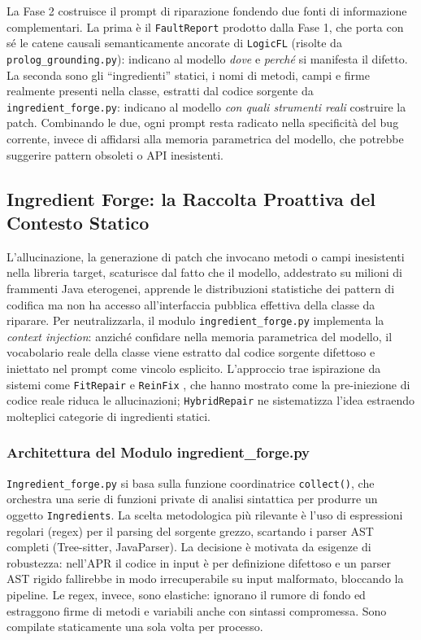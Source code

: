 La Fase 2 costruisce il prompt di riparazione fondendo due fonti di informazione complementari. La prima è il
\texttt{FaultReport} prodotto dalla Fase 1, che porta con sé le catene causali semanticamente ancorate di
\texttt{LogicFL} (risolte da \texttt{prolog\_grounding.py}): indicano al modello \emph{dove} e \emph{perché} si
manifesta il difetto. La seconda sono gli ``ingredienti'' statici, i nomi di metodi, campi e firme realmente
presenti nella classe, estratti dal codice sorgente da \texttt{ingredient\_forge.py}: indicano al modello
\emph{con quali strumenti reali} costruire la patch. Combinando le due, ogni prompt resta radicato nella
specificità del bug corrente, invece di affidarsi alla memoria parametrica del modello, che 
potrebbe suggerire pattern obsoleti o API inesistenti.

\subsection{Ingredient Forge: la Raccolta Proattiva del Contesto Statico}
\label{subsec:3_3_2}

L'allucinazione, la generazione di patch che invocano metodi o campi inesistenti nella libreria target,
scaturisce dal fatto che il modello, addestrato su milioni di frammenti Java eterogenei, apprende le distribuzioni
statistiche dei pattern di codifica ma non ha accesso all'interfaccia pubblica effettiva della classe da riparare.
Per neutralizzarla, il modulo \texttt{ingredient\_forge.py} implementa la \textit{context injection}: anziché
confidare nella memoria parametrica del modello, il vocabolario reale della classe viene estratto dal codice
sorgente difettoso e iniettato nel prompt come vincolo esplicito. L'approccio trae ispirazione da sistemi 
come \texttt{FitRepair} \cite{xia2024fitrepair} e \texttt{ReinFix} \cite{zhang2026reinfix}, che
hanno mostrato come la pre-iniezione di codice reale riduca le allucinazioni; \texttt{HybridRepair} ne sistematizza
l'idea estraendo molteplici categorie di ingredienti statici.

\subsubsection{Architettura del Modulo ingredient\_forge.py}
\texttt{Ingredient\_forge.py} si basa sulla funzione coordinatrice \texttt{collect()}, che
orchestra una serie di funzioni private di analisi sintattica per produrre un oggetto \texttt{Ingredients}. La scelta
metodologica più rilevante è l'uso di espressioni regolari (regex) per il parsing del sorgente grezzo, scartando
i parser AST completi (Tree-sitter, JavaParser). La decisione è motivata da esigenze di robustezza: nell'APR il
codice in input è per definizione difettoso e un parser AST rigido fallirebbe in modo irrecuperabile su input
malformato, bloccando la pipeline. Le regex, invece, sono elastiche: ignorano il rumore di fondo ed estraggono
firme di metodi e variabili anche con sintassi compromessa. Sono compilate staticamente una sola volta per processo.

